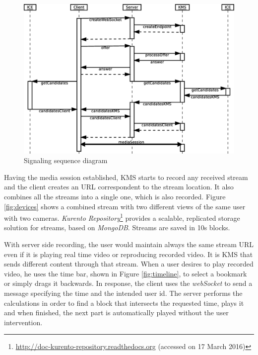 \documentclass[10pt,conference]{IEEEtran}
\begin{document}
\begin{figure}
    \centering
    \includegraphics[width=\linewidth]{figures/signaling2}
    \caption{Signaling sequence diagram}
    \label{fig:signaling2}
\end{figure} 

Having the media session established, \gls{KMS} starts to record any received stream and the client creates an \gls{URL} correspondent to the stream location.
It also combines all the streams into a single one, which is also recorded.
Figure \ref{fig:devices} shows a combined stream with two different views of the same user with two cameras.
\emph{Kurento Repository}\footnote{\url{http://doc-kurento-repository.readthedocs.org} (accessed on 17 March 2016)} provides a scalable, replicated storage solution for streams, based on \emph{MongoDB}.
Streams are saved in 10s blocks.

With server side recording, the user would maintain always the same stream \gls{URL} even if it is playing real time video or reproducing recorded video. 
It is \gls{KMS} that sends different content through that stream.
When a user desires to play recorded video, he uses the time bar, shown in Figure \ref{fig:timeline}, to select a bookmark or simply drags it backwards.
In response, the client uses the \emph{webSocket} to send a message specifying the time and the intended user id.
The server performs the calculations in order to find a block that intersects the requested time, plays it and when finished, the next part is automatically played without the user intervention.
\end{document}
